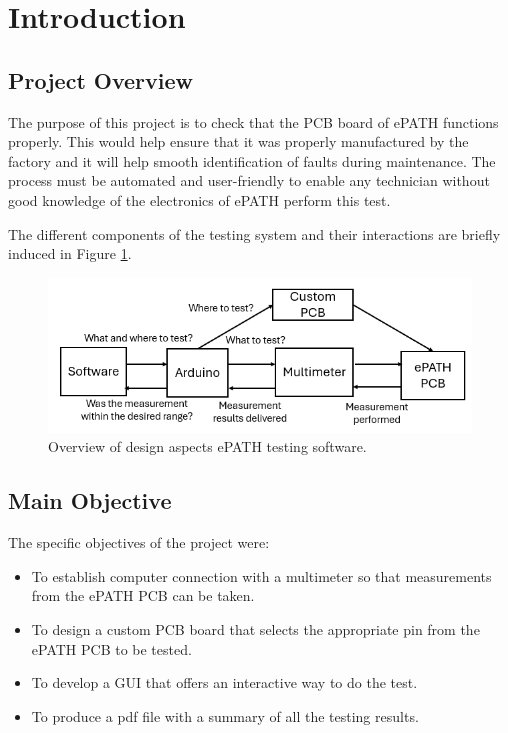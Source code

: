 \section{Introduction}
\subsection{Project Overview}
The purpose of this project is to check that the PCB board of ePATH functions properly. This would help ensure that it was properly manufactured by the factory and it will help smooth identification of faults during maintenance. The process must be automated and user-friendly to enable any technician without good knowledge of the electronics of ePATH perform this test. 

The different components of the testing system and their interactions are briefly induced in Figure \ref{end_goal_diagram}.


\begin{figure}[H]
          \centering
          \includegraphics[width=1\linewidth]{img/General end goal diagram.png}
          \caption{Overview of design aspects ePATH testing software.}
          \label{end_goal_diagram}
    \end{figure}

\subsection{Main Objective}
The specific objectives of the project were: 
\begin{itemize}
\item To establish computer connection with a multimeter so that measurements from the ePATH PCB can be taken.
\item To design a custom PCB board that selects the appropriate pin from the ePATH PCB to be tested.
\item To develop a GUI that offers an interactive way to do the test.
\item To produce a pdf file with a summary of all the testing results.
\end{itemize}

